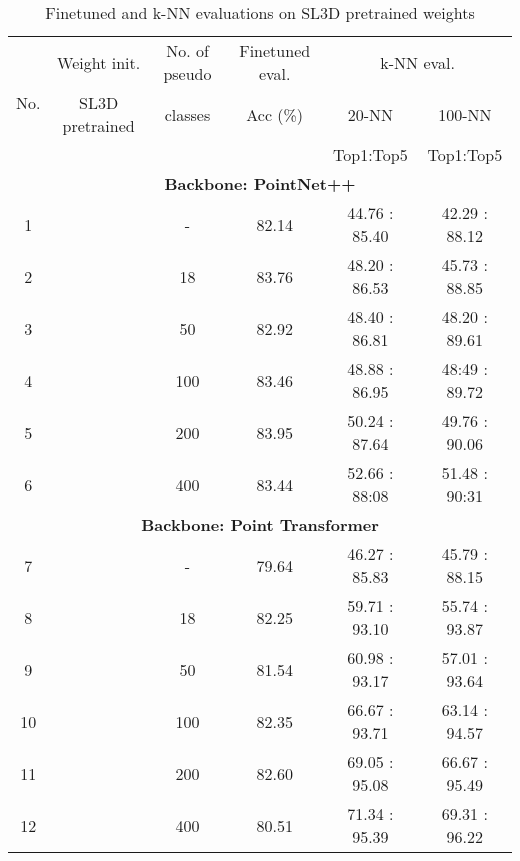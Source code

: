 \documentclass{article}
\newcommand{\cmark}{\text{\ding{51}}}\newcommand{\xmark}{\text{\ding{55}}}\newcommand{\xjqi}[1]{\textcolor{blue}{{[\textbf{xjqi}: #1]}}}
\begin{document}
\begin{table}[ht]
\caption{\label{Table:6} Finetuned and k-NN evaluations on SL3D pretrained weights}
\centering
\begin{tabular}{c c c c c | c} \toprule
    \multicolumn{1}{c}{\multirow{3}{*}{No.}}&\multicolumn{1}{c}{Weight init.}&\multicolumn{1}{c}{No. of pseudo }&\multicolumn{1}{c}{Finetuned eval.}&\multicolumn{2}{c}{k-NN eval.}\\
    \cmidrule(lr){4-4} \cmidrule(lr){5-6}
    \multicolumn{1}{c}{} & \multicolumn{1}{c}{SL3D pretrained} &{classes} & {Acc (\%)} & \multicolumn{1}{c}{20-NN} & \multicolumn{1}{c}{100-NN}\\ 
    \multicolumn{1}{c}{} & \multicolumn{1}{c}{} & \multicolumn{2}{c}{} & \multicolumn{1}{c}{Top1:Top5} & \multicolumn{1}{c}{Top1:Top5}\\ \midrule
    \multicolumn{6}{S}{\textbf{Backbone: PointNet++ \cite{qi2017pointnetplusplus}}} \\ \midrule
    {1}  & {\xmark} & {-} & {82.14} & {44.76 : 85.40} & {42.29 : 88.12}\\
    {2}  & {\cmark} & {18} & {83.76}  & {48.20 : 86.53}  & {45.73 : 88.85}\\
    {3}  & {\cmark} & {50} & {82.92} & {48.40 : 86.81}  & {48.20 : 89.61}\\
    {4}  & {\cmark} & {100} & {83.46} & {48.88 : 86.95}  & {48:49 : 89.72}\\
    {5}  & {\cmark} & {200} & {83.95} & {50.24 : 87.64}  & {49.76 : 90.06}\\
    {6}  & {\cmark} & {400} & {83.44} & {52.66 : 88:08}  & {51.48 : 90:31}\\ \midrule
    \multicolumn{6}{S}{\textbf{Backbone: Point Transformer \cite{zhao2021point}}} \\ \midrule
    {7}  & {\xmark} & {-} & {79.64} & {46.27 : 85.83}  & {45.79 : 88.15}\\ 
    {8}  & {\cmark}  & {18} & {82.25} & {59.71 : 93.10} & {55.74 : 93.87}\\
    {9}  & {\cmark}  & {50} & {81.54} & {60.98 : 93.17}  & {57.01 : 93.64}\\
    {10}  & {\cmark}  & {100} & {82.35} & {66.67 : 93.71}  & {63.14 : 94.57}\\
    {11}  & {\cmark}  & {200} & {82.60} & {69.05 : 95.08}  & {66.67 : 95.49}\\
    {12}  & {\cmark}  & {400} & {80.51} & {71.34 : 95.39}  & {69.31 : 96.22}\\ \bottomrule

\end{tabular}
\end{table}
\end{document}
